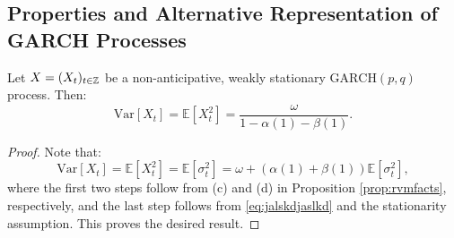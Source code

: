 \subsection{Properties and Alternative Representation of GARCH Processes}\label{ss:propsgm}
\begin{prop}\label{prop:garch-var}
Let $X=(X_{t})_{t\in\mathbb{Z}}$ be a non-anticipative, weakly stationary $\mathrm{GARCH}(p,q)$ process. %
Then:
\begin{equation}\label{eq:uncondvar-garch}
    \mathrm{Var}[X_{t}]=\mathbb{E}[X_{t}^{2}]=\frac{\omega}{1-\alpha(1)-\beta(1)}.
\end{equation}
\end{prop}
\begin{proof}
Note that:
\begin{equation*}
    \mathrm{Var}[X_{t}]=\mathbb{E}[X_{t}^{2}]=\mathbb{E}[\sigma_{t}^{2}]=\omega+\left(\alpha(1)+\beta(1)\right)\mathbb{E}[\sigma_{t}^{2}],
\end{equation*}
where the first two steps follow from (c) and (d) in Proposition \ref{prop:rvmfacts}, respectively, and the last step follows from \eqref{eq:jalskdjaslkd} and the stationarity assumption. This proves the desired result.
\end{proof}

